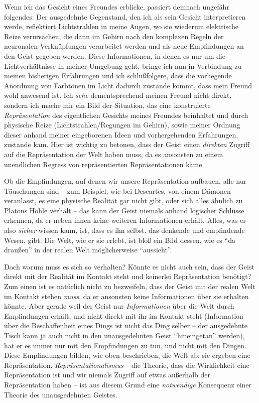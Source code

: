 \documentclass[a4paper, 12pt]{article}
\begin{document}
\begin{onehalfspace}
Wenn ich das Gesicht eines Freundes erblicke, passiert demnach ungefähr folgendes: Der ausgedehnte Gegenstand, den ich als sein Gesicht interpretieren werde, reflektiert Lichtstrahlen in meine Augen, wo sie wiederum elektrische Reize verursachen, die dann im Gehirn nach den komplexen Regeln der neuronalen Verknüpfungen verarbeitet werden und als neue Empfindungen an den Geist gegeben werden. Diese Informationen, in denen es nur um die Lichtverhältnisse in meiner Umgebung geht, bringe ich nun in Verbindung zu meinen bisherigen Erfahrungen und ich schlußfolgere, dass die vorliegende Anordnung von Farbtönen im Licht dadurch zustande kommt, dass mein Freund wohl anwesend ist. Ich \emph{sehe} dementsprechend meinen Freund nicht direkt, sondern ich mache mir ein Bild der Situation, das eine konstruierte \emph{Repräsentation} des eigentlichen Gesichts meines Freundes beinhaltet und durch physische Reize (Lichtstrahlen/Regungen im Gehirn), sowie meiner Ordnung dieser anhand meiner eingeborenen Ideen und vorhergehenden Erfahrungen, zustande kam. Hier ist wichtig zu betonen, dass der Geist einen \emph{direkten} Zugriff auf die Repräsentation der Welt haben muss, da es ansonsten zu einem unendlichen Regress von repräsentierten Repräsentationen käme.

Ob die Empfindungen, auf denen wir unsere Repräsentation aufbauen, alle nur Täu\-schungen sind -- zum Beispiel, wie bei Descartes, von einem Dämonen veranlasst, es eine physische Realität gar nicht gibt, oder sich alles ähnlich zu Platons Höhle verhält -- das kann der Geist niemals anhand logischer Schlüsse erkennen, da er neben ihnen keine weiteren Informationen erhält. Alles, was er also \emph{sicher} wissen kann, ist, dass es ihn selbst, das denkende und empfindende Wesen, gibt. Die Welt, wie er sie erlebt, ist bloß ein Bild dessen, wie es "`da draußen"' in der realen Welt möglicherweise "`aussieht"'.

Doch warum muss es sich so verhalten? Könnte es nicht auch sein, dass der Geist direkt mit der Realität im Kontakt steht und keinerlei Repräsentation benötigt? Zum einen ist es natürlich nicht zu bezweifeln, dass der Geist mit der realen Welt im Kontakt stehen \emph{muss}, da er ansonsten keine Informationen über sie erhalten könnte. Aber gerade weil der Geist nur \emph{Informationen} über die Welt durch Empfindungen erhält, und nicht direkt mit ihr im Kontakt steht (Information über die Beschaffenheit eines Dings ist nicht das Ding selber -- der ausgedehnte Tisch kann ja auch nicht in den unausgedehnten Geist "`hineingetan"' werden), hat er es immer nur mit den Empfindungen zu tun, und nicht mit den Dingen. Diese Empfindungen bilden, wie oben beschrieben, die Welt ab: sie ergeben eine Repräsentation. \emph{Repräsentationalismus} -- die Theorie, dass die Wirklichkeit eine Repräsentation ist und wir niemals Zugriff auf etwas außerhalb der Repräsentation haben -- ist aus diesem Grund eine \emph{notwendige} Konsequenz einer Theorie des unausgedehnten Geistes.


\end{onehalfspace}
\end{document}
